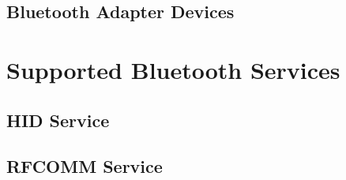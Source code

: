 \subsection{Bluetooth Adapter Devices}


\section{Supported Bluetooth Services}


\subsection{HID Service}


\subsection{RFCOMM Service}

